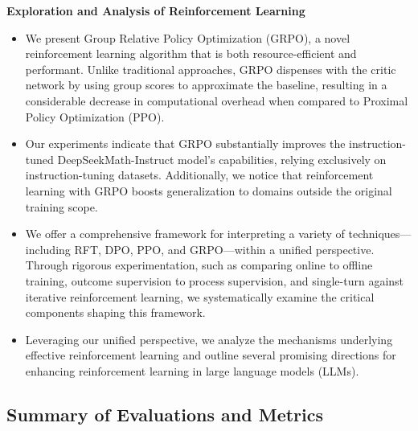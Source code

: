 \textbf{Exploration and Analysis of Reinforcement Learning}

\begin{itemize}[topsep=0pt]
    \item We present Group Relative Policy Optimization (GRPO), a novel reinforcement learning algorithm that is both resource-efficient and performant. Unlike traditional approaches, GRPO dispenses with the critic network by using group scores to approximate the baseline, resulting in a considerable decrease in computational overhead when compared to Proximal Policy Optimization (PPO).
    \item Our experiments indicate that GRPO substantially improves the instruction-tuned DeepSeekMath-Instruct model's capabilities, relying exclusively on instruction-tuning datasets. Additionally, we notice that reinforcement learning with GRPO boosts generalization to domains outside the original training scope.
    \item We offer a comprehensive framework for interpreting a variety of techniques—including RFT, DPO, PPO, and GRPO—within a unified perspective. Through rigorous experimentation, such as comparing online to offline training, outcome supervision to process supervision, and single-turn against iterative reinforcement learning, we systematically examine the critical components shaping this framework.
    \item Leveraging our unified perspective, we analyze the mechanisms underlying effective reinforcement learning and outline several promising directions for enhancing reinforcement learning in large language models (LLMs).
\end{itemize}

\subsection{Summary of Evaluations and Metrics}

